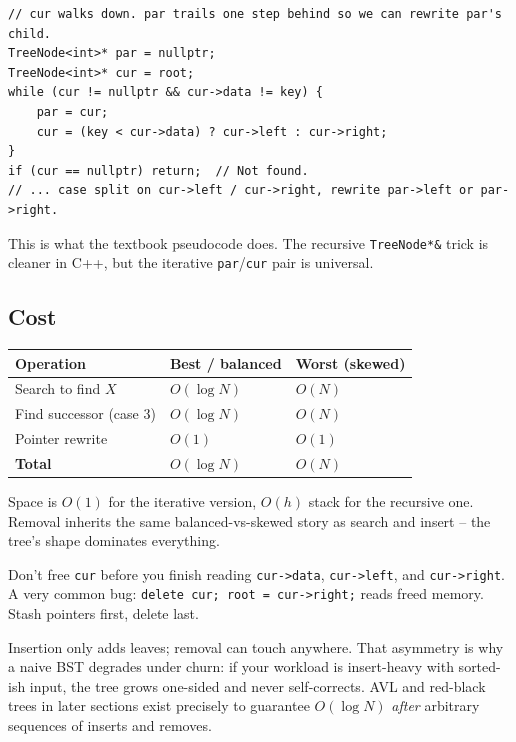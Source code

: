 \documentclass[11pt]{article}
\begin{document}
\begin{lstlisting}
// cur walks down. par trails one step behind so we can rewrite par's child.
TreeNode<int>* par = nullptr;
TreeNode<int>* cur = root;
while (cur != nullptr && cur->data != key) {
    par = cur;
    cur = (key < cur->data) ? cur->left : cur->right;
}
if (cur == nullptr) return;  // Not found.
// ... case split on cur->left / cur->right, rewrite par->left or par->right.
\end{lstlisting}

This is what the textbook pseudocode does. The recursive \texttt{TreeNode*\&} trick is cleaner in C++, but the iterative \texttt{par}/\texttt{cur} pair is universal.

\subsection*{Cost}

\begin{center}
\begin{tabular}{lll}
Operation & Best / balanced & Worst (skewed) \\
\hline
Search to find $X$       & $O(\log N)$ & $O(N)$ \\
Find successor (case 3)  & $O(\log N)$ & $O(N)$ \\
Pointer rewrite          & $O(1)$      & $O(1)$ \\
\hline
\textbf{Total}           & $O(\log N)$ & $O(N)$ \\
\end{tabular}
\end{center}

Space is $O(1)$ for the iterative version, $O(h)$ stack for the recursive one. Removal inherits the same balanced-vs-skewed story as search and insert -- the tree's shape dominates everything.

\begin{warnbox}
Don't free \texttt{cur} before you finish reading \texttt{cur->data}, \texttt{cur->left}, and \texttt{cur->right}. A very common bug: \texttt{delete cur; root = cur->right;} reads freed memory. Stash pointers first, delete last.
\end{warnbox}

\begin{ideabox}
Insertion only adds leaves; removal can touch anywhere. That asymmetry is why a naive BST degrades under churn: if your workload is insert-heavy with sorted-ish input, the tree grows one-sided and never self-corrects. AVL and red-black trees in later sections exist precisely to guarantee $O(\log N)$ \emph{after} arbitrary sequences of inserts and removes.
\end{ideabox}
\end{document}
